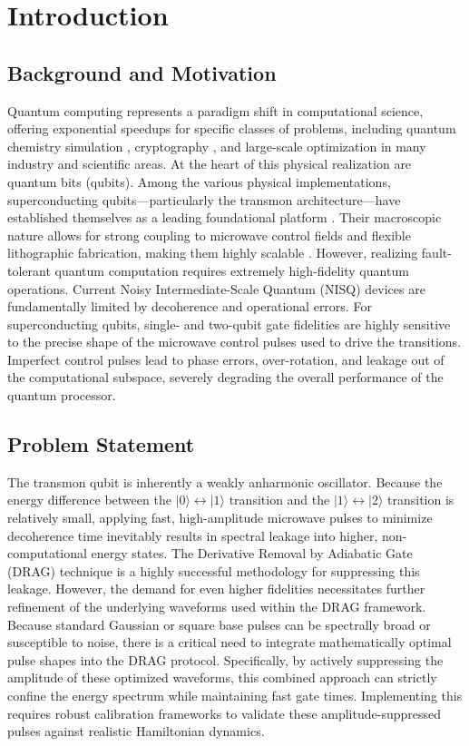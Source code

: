 %
%
\section{Introduction}
\label{sec:Introduction}

\subsection{Background and Motivation}
Quantum computing represents a paradigm shift in computational science, offering
exponential speedups for specific classes of problems, including quantum chemistry simulation \cite{Kandala2017},
cryptography \cite{cain2026shorsalgorithmpossible10000}, and
large-scale optimization \cite{Ye2025} in many industry and scientific areas. At the heart of this physical realization
are quantum bits (qubits). Among the various physical implementations, superconducting qubits---particularly the transmon
architecture---have established themselves as a leading foundational platform \cite{Acharya2025}.
Their macroscopic nature allows for strong coupling to microwave control fields and flexible
lithographic fabrication, making them highly scalable \cite{Devoret2013}. However, realizing fault-tolerant quantum computation requires
extremely high-fidelity quantum operations. Current Noisy Intermediate-Scale Quantum (NISQ) devices are fundamentally
limited by decoherence and operational errors. For superconducting qubits, single- and two-qubit gate fidelities are
highly sensitive to the precise shape of the microwave control pulses used to drive the transitions. Imperfect control
pulses lead to phase errors, over-rotation, and leakage out of the computational subspace, severely degrading the
overall performance of the quantum processor.

\subsection{Problem Statement}
The transmon qubit is inherently a weakly anharmonic oscillator. Because the energy difference between the
$\vert{}0\rangle \leftrightarrow \vert{}1\rangle$ transition and the $\vert{}1\rangle \leftrightarrow \vert{}2\rangle$
transition is relatively small, applying fast, high-amplitude microwave pulses to minimize decoherence time inevitably
results in spectral leakage into higher, non-computational energy states.
The Derivative Removal by Adiabatic Gate (DRAG) technique is a highly successful methodology for suppressing this
leakage. However, the demand for even higher fidelities necessitates further refinement of the underlying waveforms used
within the DRAG framework.
Because standard Gaussian or square base pulses can be spectrally broad or susceptible to noise, there is a critical
need to integrate mathematically optimal pulse shapes into the DRAG protocol. Specifically, by
actively suppressing the amplitude of these optimized waveforms, this combined approach can strictly confine the energy
spectrum while maintaining fast gate times. Implementing this requires robust calibration frameworks to validate these
amplitude-suppressed pulses against realistic Hamiltonian dynamics.
